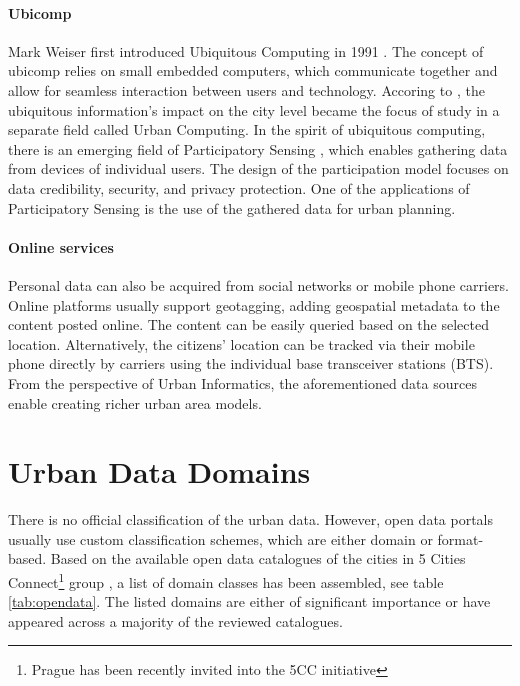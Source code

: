 \paragraph{Ubicomp} Mark Weiser first introduced Ubiquitous Computing in 1991 \cite{weiser1991computer}. The concept of ubicomp relies on small embedded computers, which communicate together and allow for seamless interaction between users and technology. Accoring to \cite{zheng2011urban}, the ubiquitous information's impact on the city level became the focus of study in a separate field called Urban Computing. In the spirit of ubiquitous computing, there is an emerging field of Participatory Sensing \cite{burke2006participatory}, which enables gathering data from devices of individual users. The design of the participation model focuses on data credibility, security, and privacy protection. One of the applications of Participatory Sensing is the use of the gathered data for urban planning. 

\paragraph{Online services}
Personal data can also be acquired from social networks or mobile phone carriers. Online platforms usually support geotagging, adding geospatial metadata to the content posted online. The content can be easily queried based on the selected location. Alternatively, the citizens' location can be tracked via their mobile phone directly by carriers using the individual base transceiver stations (BTS).  From the perspective of Urban Informatics, the aforementioned data sources enable creating richer urban area models. 

\section{Urban Data Domains}
There is no official classification of the urban data. However, open data portals usually use custom classification schemes, which are either domain or format-based. Based on the available open data catalogues of the cities in 5 Cities Connect\footnote{Prague has been recently invited into the 5CC initiative} group \cite{5CC}, a list of domain classes has been assembled, see table \ref{tab:opendata}. The listed domains are either of significant importance or have appeared across a majority of the reviewed catalogues.  


